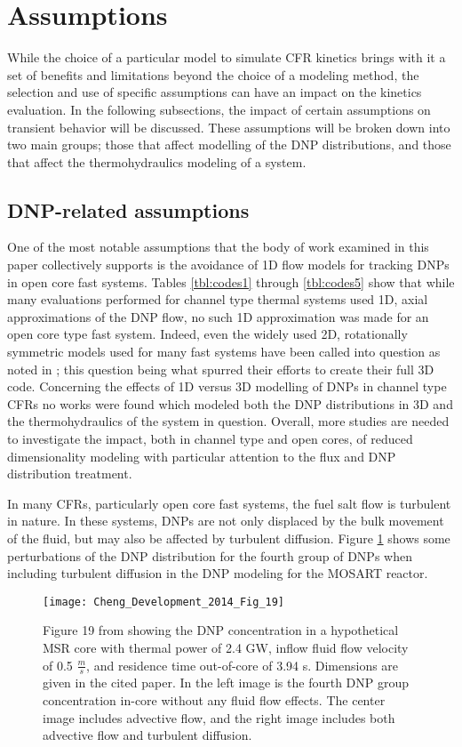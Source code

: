 \documentclass[review]{elsarticle}
\begin{document}
\section{Assumptions} \label{sec:asm}
While the choice of a particular model to simulate CFR kinetics brings
with it a set of benefits and limitations beyond the choice of a modeling
method, the selection and use of specific assumptions can have an
impact on the kinetics evaluation. In the following subsections, the
impact of certain assumptions on transient behavior will be discussed. These
assumptions will be broken down into two main groups; those that affect 
modelling of the DNP distributions, and those that affect the thermohydraulics
modeling of a system.

\subsection{DNP-related assumptions} \label{ssec:dnp_asm}
One of the most notable assumptions
that the body of work examined in this paper collectively supports is the
avoidance of 1D flow models for tracking DNPs in open core fast systems.
Tables \ref{tbl:codes1} through \ref{tbl:codes5}
 show that while many evaluations performed
for channel type thermal systems used 1D, axial approximations of the DNP
flow, no such 1D approximation was made for an open core type fast system.
Indeed, even the widely used 2D, rotationally symmetric models used for many
fast systems have been called into question as noted in
\cite{aufiero_development_2014}; this question being what spurred their efforts
to create their full 3D code. Concerning the effects of 1D versus 3D modelling
of DNPs in channel type CFRs no works were found
which modeled both the DNP distributions in 3D and the thermohydraulics of
the system in question. Overall, more studies are needed to investigate the
impact, both in channel type and open cores, of reduced dimensionality
modeling with particular attention to the flux and DNP distribution treatment.
\par In many CFRs, particularly open core fast systems, the fuel salt flow is
turbulent in nature. In these systems, DNPs are not only displaced by the
bulk movement of the fluid, but may also be affected by turbulent diffusion.
Figure \ref{fig:cheng_diffusion} shows some perturbations of the DNP
distribution for the fourth group of DNPs when including turbulent diffusion
in the DNP modeling for the MOSART reactor.

\begin{figure}[H]
   \centering
   \texttt{[image: Cheng\_Development\_2014\_Fig\_19]}
   \caption{Figure 19 from \cite{cheng_development_2014} showing the DNP
   concentration in a
   hypothetical MSR core with thermal power of 2.4 GW, inflow fluid flow
   velocity of 0.5
   $\frac{m}{s}$, and residence time out-of-core of 3.94 s. Dimensions are 
   given in the cited
   paper. In the left image is the fourth
   DNP group concentration in-core without any fluid flow effects. The center
   image
   includes advective flow, and the right image includes both advective flow and
   turbulent diffusion.} 
   \label{fig:cheng_diffusion}
\end{figure}
\end{document}

